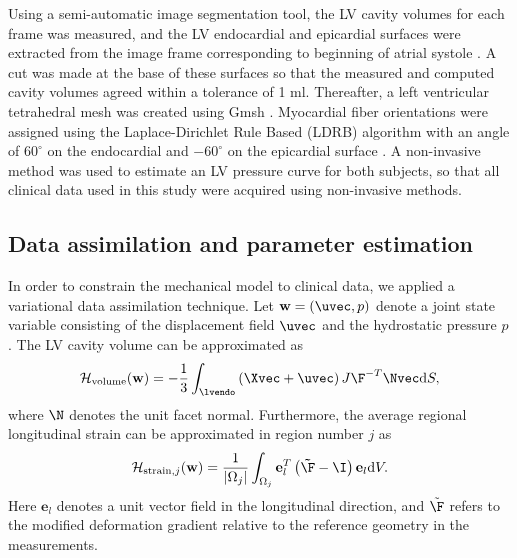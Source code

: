 Using a semi-automatic image segmentation tool, the LV cavity volumes for
each frame was measured, and the LV endocardial and epicardial
surfaces were extracted from the image frame corresponding to
beginning of atrial systole \cite{hansegaard2009semi}. A cut was made
at the base of these surfaces so that the measured and computed cavity
volumes agreed within a tolerance of 1 ml. Thereafter, a left
ventricular tetrahedral mesh was created using Gmsh
\cite{geuzaine2009gmsh}. Myocardial fiber orientations were assigned
using the Laplace-Dirichlet Rule Based  (LDRB) algorithm
\cite{bayer2012novel} with an angle of $60^{\circ}$ on the endocardial
and $-60^{\circ}$ on the epicardial surface
\cite{streeter1969fiber}. A non-invasive method
\cite{russell2012novel} was used to estimate an LV pressure curve for
both subjects, so that all clinical data used in this study were
acquired using non-invasive methods. 


\subsection{Data assimilation and parameter estimation}

In order to constrain the mechanical model to clinical data, we
applied a variational data assimilation technique. Let $\mathbf{w} =
(\uvec,p)$ denote a joint state variable consisting of the
displacement field $\uvec$ and the hydrostatic pressure $p$. The LV
cavity volume can be approximated as  
\begin{align}
  \mathcal{H}_{\mathrm{volume}}(\mathbf{w})= -\frac{1}{3}\int_{\lvendo}
  \left( \Xvec + \uvec \right) J \F^{-T} \Nvec \mathrm{d}S, 
  \label{eq:volume_operator}
\end{align}
where $\N$ denotes the unit facet normal. Furthermore, the average regional
longitudinal strain can be approximated in region number $j$ as
\begin{align}
  \mathcal{H}_{\mathrm{strain}, j}(\mathbf{w}) = \frac{1}{|\Omega_j|}\int_{\Omega_j}
  \mathbf{e}_l^T \left( \mathbf{\tilde{\F} - \I} \right)\mathbf{e}_l  \mathrm{d}V.
\end{align}
Here $\mathbf{e}_l$ denotes a unit vector field in
the longitudinal direction, and $\tilde{\F}$ refers to the modified deformation
gradient relative to the reference geometry in the measurements. 

